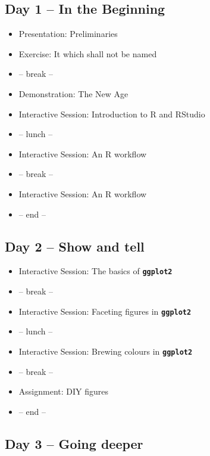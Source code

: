 \documentclass[
]{book}
\providecommand{\tightlist}{%
  \setlength{\itemsep}{0pt}\setlength{\parskip}{0pt}}
\begin{document}
\hypertarget{day-1-in-the-beginning}{%
\subsection*{Day 1 -- In the Beginning}\label{day-1-in-the-beginning}}

\begin{itemize}
\tightlist
\item
  Presentation: Preliminaries
\item
  Exercise: It which shall not be named
\item
  -- break --
\item
  Demonstration: The New Age
\item
  Interactive Session: Introduction to R and RStudio
\item
  -- lunch --
\item
  Interactive Session: An R workflow
\item
  -- break --
\item
  Interactive Session: An R workflow
\item
  -- end --
\end{itemize}

\hypertarget{day-2-show-and-tell}{%
\subsection*{Day 2 -- Show and tell}\label{day-2-show-and-tell}}

\begin{itemize}
\tightlist
\item
  Interactive Session: The basics of \textbf{\texttt{ggplot2}}
\item
  -- break --
\item
  Interactive Session: Faceting figures in \textbf{\texttt{ggplot2}}
\item
  -- lunch --
\item
  Interactive Session: Brewing colours in \textbf{\texttt{ggplot2}}
\item
  -- break --
\item
  Assignment: DIY figures
\item
  -- end --
\end{itemize}

\hypertarget{day-3-going-deeper}{%
\subsection*{Day 3 -- Going deeper}\label{day-3-going-deeper}}
\end{document}
